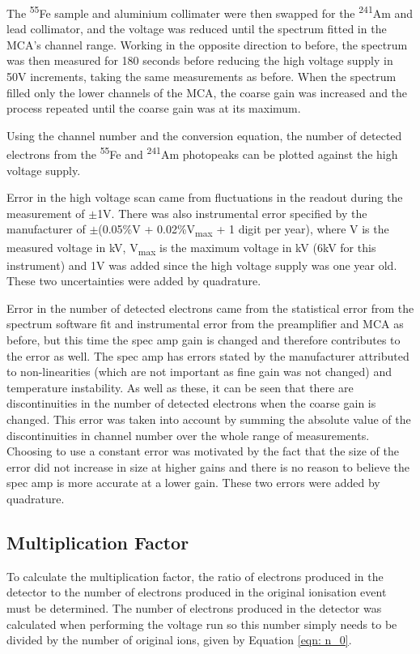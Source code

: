 The \textsuperscript{55}Fe sample and aluminium collimater were then swapped for the \textsuperscript{241}Am and lead collimator, and the voltage was reduced until the spectrum fitted in the MCA's channel range. Working in the opposite direction to before, the spectrum was then measured for 180 seconds before reducing the high voltage supply in 50V increments, taking the same measurements as before. When the spectrum filled only the lower channels of the MCA, the coarse gain was increased and the process repeated until the coarse gain was at its maximum.

Using the channel number and the conversion equation, the number of detected electrons from the \textsuperscript{55}Fe and \textsuperscript{241}Am photopeaks can be plotted against the high voltage supply.

Error in the high voltage scan came from fluctuations in the readout during the measurement of $\pm$1V. There was also instrumental error specified by the manufacturer of $\pm$(0.05\%V + 0.02\%V\textsubscript{max} + 1 digit per year), where V is the measured voltage in kV, V\textsubscript{max} is the maximum voltage in kV (6kV for this instrument) and 1V was added since the high voltage supply was one year old. These two uncertainties were added by quadrature.

Error in the number of detected electrons came from the statistical error from the spectrum software fit and instrumental error from the preamplifier and MCA as before, but this time the spec amp gain is changed and therefore contributes to the error as well. The spec amp has errors stated by the manufacturer attributed to non-linearities (which are not important as fine gain was not changed) and temperature instability. As well as these, it can be seen that there are discontinuities in the number of detected electrons when the coarse gain is changed. This error was taken into account by summing the absolute value of the discontinuities in channel number over the whole range of measurements. Choosing to use a constant error was motivated by the fact that the size of the error did not increase in size at higher gains and there is no reason to believe the spec amp is more accurate at a lower gain. These two errors were added by quadrature.

\subsection{Multiplication Factor}

To calculate the multiplication factor, the ratio of electrons produced in the detector to the number of electrons produced in the original ionisation event must be determined. The number of electrons produced in the detector was calculated when performing the voltage run so this number simply needs to be divided by the number of original ions, given by Equation \ref{eqn: n_0}.

